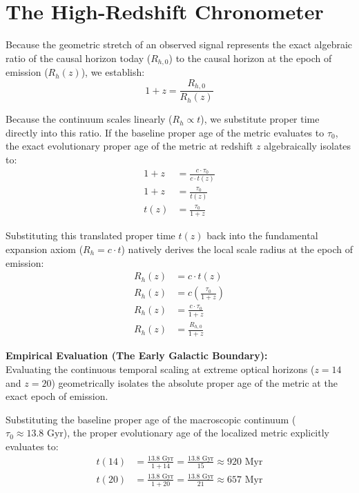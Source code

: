 \documentclass[11pt, a4paper]{article}
\begin{document}
\section{The High-Redshift Chronometer}
\label{sec:deriv_chronometer}

Because the geometric stretch of an observed signal represents the exact algebraic ratio of the causal horizon today ($R_{h,0}$) to the causal horizon at the epoch of emission ($R_h(z)$), we establish:
\begin{equation}
    1+z = \frac{R_{h,0}}{R_h(z)}
\end{equation}

Because the continuum scales linearly ($R_h \propto t$), we substitute proper time directly into this ratio. If the baseline proper age of the metric evaluates to $\tau_0$, the exact evolutionary proper age of the metric at redshift $z$ algebraically isolates to:
\begin{align}
    1+z &= \frac{c \cdot \tau_0}{c \cdot t(z)} \\
    1+z &= \frac{\tau_0}{t(z)} \\
    t(z) &= \frac{\tau_0}{1+z}
\end{align}

Substituting this translated proper time $t(z)$ back into the fundamental expansion axiom ($R_h = c \cdot t$) natively derives the local scale radius at the epoch of emission:
\begin{align}
    R_h(z) &= c \cdot t(z) \\
    R_h(z) &= c \left( \frac{\tau_0}{1+z} \right) \\
    R_h(z) &= \frac{c \cdot \tau_0}{1+z} \\
    R_h(z) &= \frac{R_{h,0}}{1+z}
\end{align}

\vspace{0.2cm}
\textbf{Empirical Evaluation (The Early Galactic Boundary):} \\
Evaluating the continuous temporal scaling at extreme optical horizons ($z = 14$ and $z = 20$) geometrically isolates the absolute proper age of the metric at the exact epoch of emission. 

Substituting the baseline proper age of the macroscopic continuum ($\tau_0 \approx 13.8 \text{ Gyr}$), the proper evolutionary age of the localized metric explicitly evaluates to:
\begin{align}
    t(14) &= \frac{13.8 \text{ Gyr}}{1 + 14} = \frac{13.8 \text{ Gyr}}{15} \approx 920 \text{ Myr} \\
    t(20) &= \frac{13.8 \text{ Gyr}}{1 + 20} = \frac{13.8 \text{ Gyr}}{21} \approx 657 \text{ Myr}
\end{align}
\end{document}
